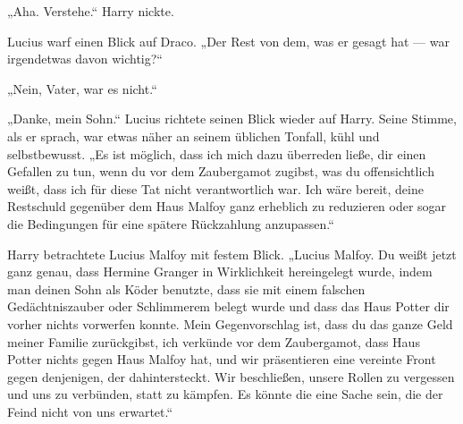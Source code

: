 „Aha. Verstehe.“ Harry nickte.

Lucius warf einen Blick auf Draco.
„Der Rest von dem, was er gesagt hat — war irgendetwas davon wichtig?“

„Nein, Vater, war es nicht.“

„Danke, mein Sohn.“ Lucius richtete seinen Blick wieder auf Harry. Seine Stimme, als er sprach, war etwas näher an seinem üblichen Tonfall, kühl und selbstbewusst.
„Es ist möglich, dass ich mich dazu überreden ließe, dir einen Gefallen zu tun, wenn du vor dem Zaubergamot zugibst, was du offensichtlich weißt, dass ich für diese Tat nicht verantwortlich war. Ich wäre bereit, deine Restschuld gegenüber dem Haus Malfoy ganz erheblich zu reduzieren oder sogar die Bedingungen für eine spätere Rückzahlung anzupassen.“

Harry betrachtete Lucius Malfoy mit festem Blick.
„Lucius Malfoy. Du weißt jetzt ganz genau, dass Hermine Granger in Wirklichkeit hereingelegt wurde, indem man deinen Sohn als Köder benutzte, dass sie mit einem falschen Gedächtniszauber oder Schlimmerem belegt wurde und dass das Haus Potter dir vorher nichts vorwerfen konnte. Mein Gegenvorschlag ist, dass du das ganze Geld meiner Familie zurückgibst, ich verkünde vor dem Zaubergamot, dass Haus Potter nichts gegen Haus Malfoy hat, und wir präsentieren eine vereinte Front gegen denjenigen, der dahintersteckt. Wir beschließen, unsere Rollen zu vergessen und uns zu verbünden, statt zu kämpfen. Es könnte die eine Sache sein, die der Feind nicht von uns erwartet.“

